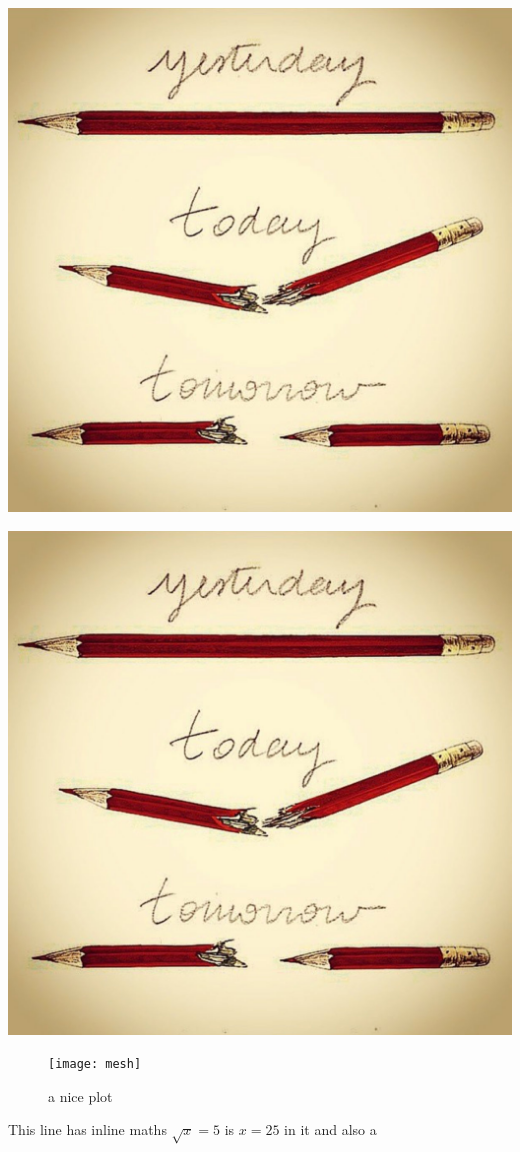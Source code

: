 \documentclass{article}
\begin{document}
\includegraphics{test-image.jpg}

\includegraphics{test-image}


\begin{figure}[h]
    \centering
    \texttt{[image: mesh]}
    \caption{a nice plot}
    \label{fig:mesh1}
\end{figure}


This line has inline maths $\sqrt{x} = 5$ is $x=25$ in it and also a \cite{Swan2008}
\end{document}
